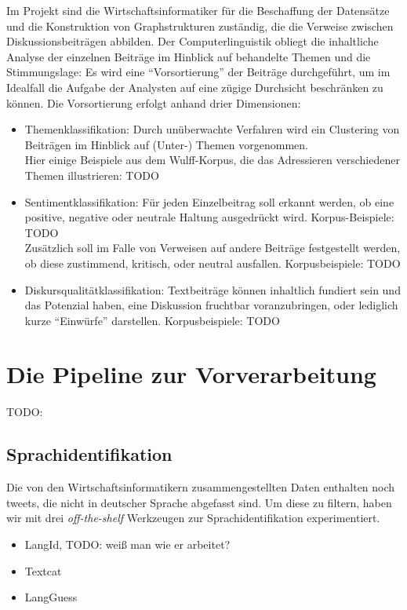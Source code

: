 \documentclass[11pt]{article}
\begin{document}
Im Projekt sind die Wirtschaftsinformatiker für die Beschaffung der
Datensätze und die Konstruktion von Graphstrukturen zuständig, die die
Verweise zwischen Diskussionsbeiträgen abbilden. Der
Computerlinguistik obliegt die inhaltliche Analyse der einzelnen
Beiträge im Hinblick auf behandelte Themen und die Stimmungslage: Es
wird eine ``Vorsortierung'' der Beiträge durchgeführt, um im Idealfall
die Aufgabe der Analysten auf eine zügige Durchsicht beschränken zu
können. Die Vorsortierung erfolgt anhand drier Dimensionen:
\begin{itemize}
\item Themenklassifikation: Durch unüberwachte Verfahren wird ein
  Clustering von Beiträgen im Hinblick auf (Unter-) Themen
  vorgenommen.\\ Hier einige Beispiele aus dem Wulff-Korpus, die das
  Adressieren verschiedener Themen illustrieren: TODO
\item Sentimentklassifikation: Für jeden Einzelbeitrag soll erkannt
  werden, ob eine positive, negative oder neutrale Haltung ausgedrückt
  wird. Korpus-Beispiele: TODO\\ Zusätzlich soll im Falle von Verweisen auf andere Beiträge
  festgestellt werden, ob diese zustimmend, kritisch, oder neutral
  ausfallen. Korpusbeispiele: TODO
\item Diskursqualitätklassifikation: Textbeiträge können inhaltlich
  fundiert sein und das Potenzial haben, eine Diskussion fruchtbar
  voranzubringen, oder lediglich kurze ``Einwürfe''
  darstellen. Korpusbeispiele: TODO
\end{itemize}


\section{Die Pipeline zur Vorverarbeitung}

TODO:
\subsection{Sprachidentifikation}

Die von den Wirtschaftsinformatikern zusammengestellten Daten
enthalten noch tweets, die nicht in deutscher Sprache abgefasst
sind. Um diese zu filtern, haben wir mit drei {\em off-the-shelf}
Werkzeugen zur Sprachidentifikation experimentiert.

\begin{itemize}
\item LangId, TODO: weiß man wie er arbeitet?
\item Textcat
\item LangGuess
\end{itemize}
\end{document}
